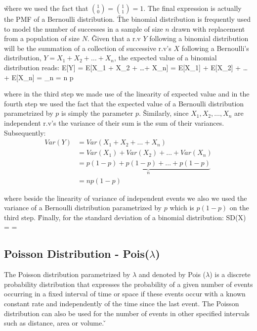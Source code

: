 \v

where we used the fact that $\binom{1}{0} = \binom{1}{1} = 1$. The final expression is actually the PMF of a
Bernoulli distribution. \v

The binomial distribution is frequently used to model the number of successes in a sample of size $n$ drawn with
replacement from a population of size $N$. \v

Given that a r.v $Y$ following a binomial distribution will be the summation of a collection of successive r.v's $X$
following a Bernoulli's distribution, $Y = X_{1} + X_{2} + \ldots + X_{n}$, the expected value of a binomial
distribution reads:
\bse
E[Y] = E[X_{1} + X_{2} + \ldots + X_{n}] = E[X_{1}] + E[X_{2}] + \ldots + E[X_{n}]
= _{n} = n p
\ese

where in the third step we made use of the linearity of expected value and in the fourth step we used the fact that
the expected value of a Bernoulli distribution parametrized by $p$ is simply the parameter $p$. \v

Similarly, since ${X_{1}, X_{2}, \ldots, X_{n}}$ are independent r.v's the variance of their sum is the sum of their
variances. Subsequently:
{\setlength{\jot}{10pt}
\begin{align*}
Var(Y) &= Var(X_{1} + X_{2} + \ldots + X_{n}) \\
&= Var(X_{1}) + Var(X_{2}) + \ldots + Var(X_{n}) \\
&= \underbrace{p(1-p) + p(1-p) + \ldots + p(1-p)}_{n} \\
&= n p(1-p)
\end{align*}}

where beside the linearity of variance of independent events we also we used the variance of a Bernoulli distribution
parametrized by $p$ which is $p(1-p)$ on the third step. \v

Finally, for the standard deviation of a binomial distribution:
\bse
SD(X) =  = 
\ese

\subsection{Poisson Distribution - Pois($\lambda$)}

The Poisson distribution parametrized by $\lambda$ and denoted by Pois ($\lambda$) is a discrete probability
distribution that expresses the probability of a given number of events occurring in a fixed interval of time or
space if these events occur with a known constant rate and independently of the time since the last event. The
Poisson distribution can also be used for the number of events in other specified intervals such as distance, area or
volume. \v

